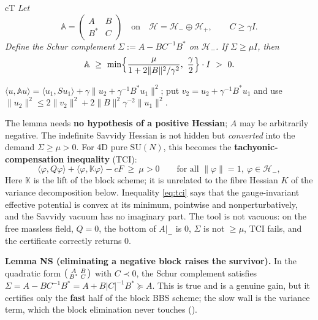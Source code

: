 \begin{claimbox}{cT}
 \emph{Let}
\begin{equation}
\mathbb{A}=\begin{pmatrix} A & B\\ B^* & C\end{pmatrix}
\quad\text{on}\quad \mathcal{H}=\mathcal{H}_-\oplus\mathcal{H}_+,
\qquad C\ge\gamma I .
\label{eq:twoblock}
\end{equation}
\emph{Define the Schur complement $\Sigma:=A-BC^{-1}B^*$ on $\mathcal{H}_-$. If $\Sigma\ge\mu I$, then}
\begin{equation}
\mathbb{A}\ \ge\ \min\Bigl\{\frac{\mu}{1+2\|B\|^2/\gamma^2},\ \frac{\gamma}{2}\Bigr\}\cdot I\ >\ 0 .
\label{eq:twoblock-bound}
\end{equation}
\begin{proofx}
$\langle u,\mathbb{A}u\rangle=\langle u_1,Su_1\rangle+\gamma\|u_2+\gamma^{-1}B^*u_1\|^2$; put
$v_2=u_2+\gamma^{-1}B^*u_1$ and use
$\|u_2\|^2\le2\|v_2\|^2+2\|B\|^2\gamma^{-2}\|u_1\|^2$.
\end{proofx}

The lemma needs \textbf{no hypothesis of a positive Hessian}; $A$ may be arbitrarily negative.
The indefinite Savvidy Hessian is not hidden but \emph{converted} into the demand $\Sigma\ge\mu>0$.
For 4D pure $\mathrm{SU}(N)$, this becomes the \textbf{tachyonic-compensation inequality} (TCI):
\begin{equation}
\langle\varphi,Q\varphi\rangle+\langle\varphi,\mathbb{K}\varphi\rangle-cF\ \ge\ \mu>0
\qquad\text{for all }\|\varphi\|=1,\ \varphi\in\mathcal{H}_- ,
\label{eq:tci}
\end{equation}
Here $\mathbb{K}$ is the lift of the block scheme; it is unrelated to the fibre Hessian $K$ of
the variance decomposition below. Inequality \eqref{eq:tci} says that the gauge-invariant
effective potential is convex at its minimum, pointwise and
nonperturbatively, and the Savvidy vacuum has no imaginary part. The tool is not vacuous: on the
free massless field, $Q=0$, the bottom of $A|_-$ is $0$, $\Sigma$ is not $\ge\mu$, TCI fails, and the
certificate correctly returns $0$.

\smallskip
\textbf{Lemma NS (eliminating a negative block raises the survivor).} In the quadratic form
$\begin{psmallmatrix}A&B\\B^*&C\end{psmallmatrix}$ with $C\prec0$, the Schur complement satisfies
$\Sigma=A-BC^{-1}B^*=A+B|C|^{-1}B^*\succeq A$. This is true and is a genuine gain, but it
certifies only the \textbf{fast} half of the block BBS scheme; the slow wall is the variance
term, which the block elimination never touches
().


\end{claimbox}
